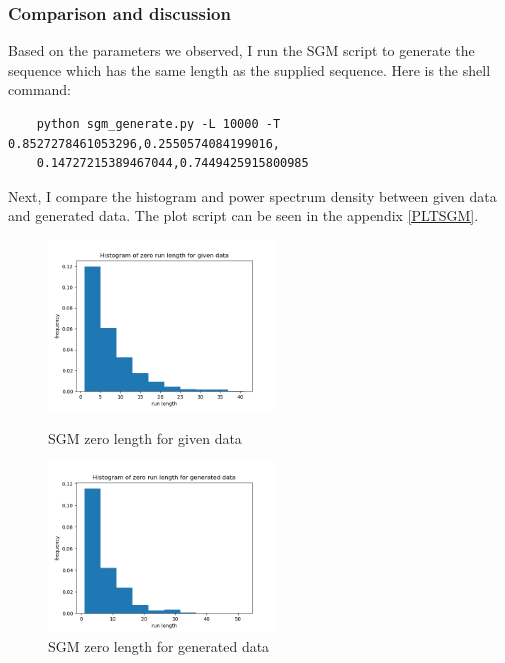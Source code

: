 \documentclass[11pt]{article}
\begin{document}
\subsubsection{Comparison and discussion}
Based on the parameters we observed, I run the SGM script to generate the sequence which has the same length as the supplied sequence.
Here is the shell command:
\begin{verbatim}
    python sgm_generate.py -L 10000 -T 0.8527278461053296,0.2550574084199016,
    0.14727215389467044,0.7449425915800985
\end{verbatim}
Next, I compare the histogram and power spectrum density between given data and generated data. The plot script can be seen in the appendix \ref{PLTSGM}.
\begin{figure}[htbp]
    \centering
    \begin{minipage}[t]{0.48\textwidth}
    \centering
    \includegraphics[width=6cm]{Histogram_of_zero_run_length_for_given_data.png}
    \caption{SGM zero length for given data}
    \end{minipage}
    \begin{minipage}[t]{0.48\textwidth}
    \centering
    \includegraphics[width=6cm]{Histogram_of_zero_run_length_for_generated_data.png}
    \caption{SGM zero length for generated data}
    \end{minipage}
\end{figure}
\end{document}
